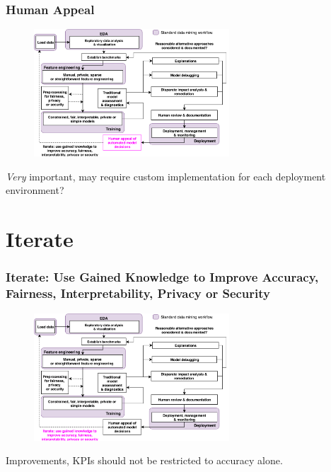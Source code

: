 \documentclass[11pt,
               aspectratio=169,
               hyperref={colorlinks}
               ]{beamer}
\begin{document}
		\begin{frame}	
			\frametitle{Human Appeal}		
			
			\begin{figure}[htb]
				\begin{center}
					\includegraphics[height=135pt]{img/ha.png}
					\label{fig:blueprint}
				\end{center}
			\end{figure}	

			\centering
			\textit{Very} important, may require custom implementation for each deployment environment?

		\end{frame}

	\section{Iterate}

		\begin{frame}	

			\frametitle{Iterate: Use Gained Knowledge to Improve Accuracy, Fairness, Interpretability, Privacy or Security}		
			
			\begin{figure}[htb]
				\begin{center}
					\includegraphics[height=135pt]{img/iter.png}
					\label{fig:blueprint}
				\end{center}
			\end{figure}	

			\centering
			
			Improvements, KPIs should not be restricted to accuracy alone.
		
		\end{frame}
\end{document}
